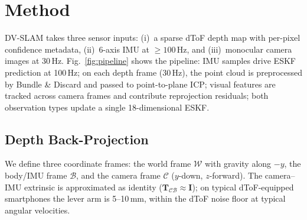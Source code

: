 \section{Method}
\label{sec:method}

DV-SLAM takes three sensor inputs: (i)~a sparse dToF depth map with per-pixel confidence metadata, (ii)~6-axis IMU at ${\geq}100$\,Hz, and (iii)~monocular camera images at 30\,Hz.
Fig.~\ref{fig:pipeline} shows the pipeline: IMU samples drive ESKF prediction at 100\,Hz; on each depth frame (30\,Hz), the point cloud is preprocessed by Bundle \& Discard and passed to point-to-plane ICP; visual features are tracked across camera frames and contribute reprojection residuals; both observation types update a single 18-dimensional ESKF.

\subsection{Depth Back-Projection}
\label{sec:backproj}

We define three coordinate frames: the world frame $\mathcal{W}$ with gravity along $-y$, the body/IMU frame $\mathcal{B}$, and the camera frame $\mathcal{C}$ ($y$-down, $z$-forward).
The camera--IMU extrinsic is approximated as identity ($\mathbf{T}_{\mathcal{C}\mathcal{B}} \approx \mathbf{I}$); on typical dToF-equipped smartphones the lever arm is 5--10\,mm, within the dToF noise floor at typical angular velocities.

